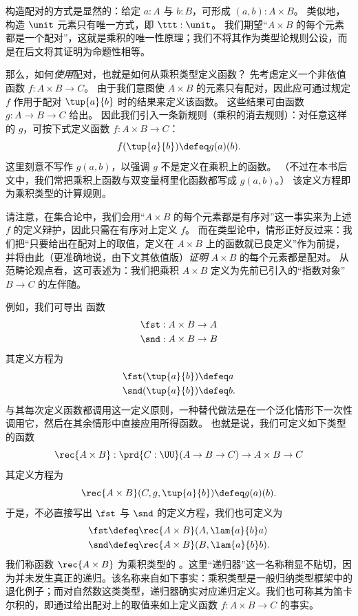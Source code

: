 构造配对的方式是显然的：给定 $a:A$ 与 $b:B$，可形成 $(a,b):A\times B$。
类似地，构造 $\unit$ 元素只有唯一方式，即 $\ttt:\unit$。
我们期望“$A\times B$ 的每个元素都是一个配对”，这就是乘积的唯一性原理；我们不将其作为类型论规则公设，而是在后文将其证明为命题性相等。

那么，如何\emph{使用}配对，也就是如何从乘积类型定义函数？
先考虑定义一个非依值函数 $f : A\times B \to C$。
由于我们意图使 $A\times B$ 的元素只有配对，因此应可通过规定 $f$ 作用于配对 $\tup{a}{b}$ 时的结果来定义该函数。
这些结果可由函数 $g : A \to B \to C$ 给出。
因此我们引入一条新规则（乘积的消去规则）：对任意这样的 $g$，可按下式定义函数 $f : A\times B \to C$：
\[ f(\tup{a}{b}) \defeq g(a)(b). \]
这里刻意不写作 $g(a,b)$，以强调 $g$ 不是定义在乘积上的函数。
（不过在本书后文中，我们常把乘积上函数与双变量柯里化函数都写成 $g(a,b)$。）
该定义方程即为乘积类型的计算规则。

请注意，在集合论中，我们会用“$A\times B$ 的每个元素都是有序对”这一事实来为上述 $f$ 的定义辩护，因此只需在有序对上定义 $f$。
而在类型论中，情形正好反过来：我们把“只要给出在配对上的取值，定义在 $A\times B$ 上的函数就已良定义”作为前提，并将由此（更准确地说，由下文其依值版）\emph{证明} $A\times B$ 的每个元素都是配对。
从范畴论观点看，这可表述为：我们把乘积 $A\times B$ 定义为先前已引入的“指数对象” $B\to C$ 的左伴随。

例如，我们可导出
%
%
%
函数
%
\begin{align*}
  \fst & :  A \times B \to A \\
  \snd & :  A \times B \to B
\end{align*}
其定义方程为
\begin{align*}
  \fst(\tup{a}{b}) & \defeq  a \\
  \snd(\tup{a}{b}) & \defeq  b.
\end{align*}
%
%
与其每次定义函数都调用这一定义原则，一种替代做法是在一个泛化情形下一次性调用它，然后在其余情形中直接应用所得函数。
也就是说，我们可定义如下类型的函数
\begin{equation}
  \rec{A\times B} : \prd{C:\UU}(A \to B \to C) \to A \times B \to C
\end{equation}
其定义方程为
\[\rec{A\times B}(C,g,\tup{a}{b}) \defeq g(a)(b). \]
于是，不必直接写出 $\fst$ 与 $\snd$ 的定义方程，我们也可定义为
\begin{align*}
  \fst &\defeq \rec{A\times B}(A, \lam{a}{b} a)\\
  \snd &\defeq \rec{A\times B}(B, \lam{a}{b} b).
\end{align*}
我们称函数 $\rec{A\times B}$ 为乘积类型的
%
。这里“递归器”这一名称稍显不贴切，因为并未发生真正的递归。该名称来自如下事实：乘积类型是一般归纳类型框架中的退化例子；而对自然数这类类型，递归器确实对应递归定义。我们也可称其为笛卡尔积的，即通过给出配对上的取值来如上定义函数 $f:A\times B\to C$ 的事实。
%

